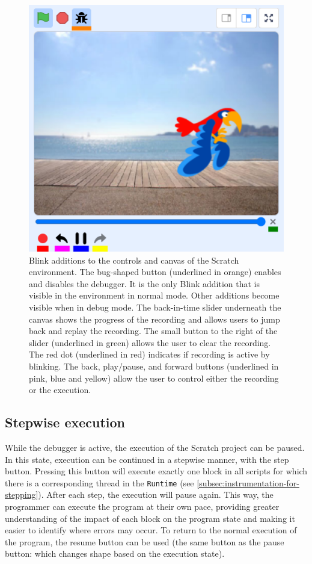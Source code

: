 \documentclass[../main]{subfiles}
\begin{document}
\begin{figure}
    \centering
    \includegraphics[width=\textwidth]{scratch-debugger-ide}
    \caption{
        Blink additions to the controls and canvas of the Scratch environment.
        The bug-shaped button (underlined in orange) enables and disables the debugger.
        It is the only Blink addition that is visible in the environment in normal mode.
        Other additions become visible when in debug mode.
        The back-in-time slider underneath the canvas shows the progress of the recording and allows users to jump back and replay the recording.
        The small button to the right of the slider (underlined in green) allows the user to clear the recording.
        The red dot (underlined in red) indicates if recording is active by blinking.
        The back, play/pause, and forward buttons (underlined in pink, blue and yellow) allow the user to control either the recording or the execution.
    }
    \label{fig:blink-ide}
\end{figure}

\subsection{Stepwise execution}\label{subsec:stepwise-execution}
While the debugger is active, the execution of the Scratch project can be paused.
In this state, execution can be continued in a stepwise manner, with the step button.
Pressing this button will execute exactly one block in all scripts for which there is a corresponding thread in the \texttt{Runtime} (see \cref{subsec:instrumentation-for-stepping}).
After each step, the execution will pause again.
This way, the programmer can execute the program at their own pace, providing greater understanding of the impact of each block on the program state and making it easier to identify where errors may occur.
To return to the normal execution of the program, the resume button can be used (the same button as the pause button: which changes shape based on the execution state).
\end{document}
